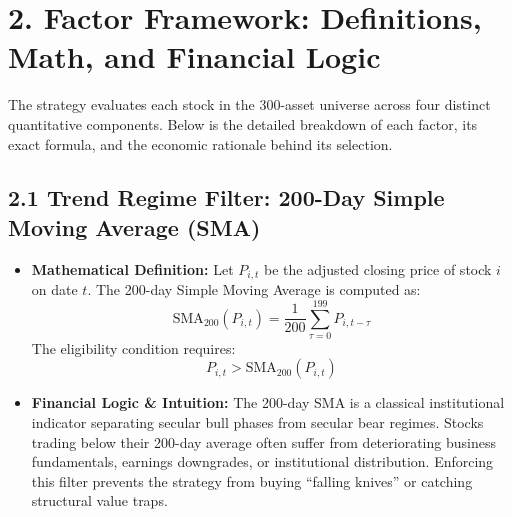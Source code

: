 \documentclass[11pt,a4paper]{article}
\begin{document}
\section{2. Factor Framework: Definitions, Math, and Financial Logic}
The strategy evaluates each stock in the 300-asset universe across four distinct quantitative components. Below is the detailed breakdown of each factor, its exact formula, and the economic rationale behind its selection.

\subsection{2.1 Trend Regime Filter: 200-Day Simple Moving Average (SMA)}
\begin{itemize}[leftmargin=1.5em]
    \item \textbf{Mathematical Definition:} Let $P_{i, t}$ be the adjusted closing price of stock $i$ on date $t$. The 200-day Simple Moving Average is computed as:
    \begin{equation}
        \text{SMA}_{200}(P_{i, t}) = \frac{1}{200}\sum_{\tau=0}^{199} P_{i, t-\tau}
    \end{equation}
    The eligibility condition requires:
    \begin{equation}
        P_{i, t} > \text{SMA}_{200}(P_{i, t})
    \end{equation}
    \item \textbf{Financial Logic \& Intuition:} The 200-day SMA is a classical institutional indicator separating secular bull phases from secular bear regimes. Stocks trading below their 200-day average often suffer from deteriorating business fundamentals, earnings downgrades, or institutional distribution. Enforcing this filter prevents the strategy from buying ``falling knives'' or catching structural value traps.
\end{itemize}
\end{document}
